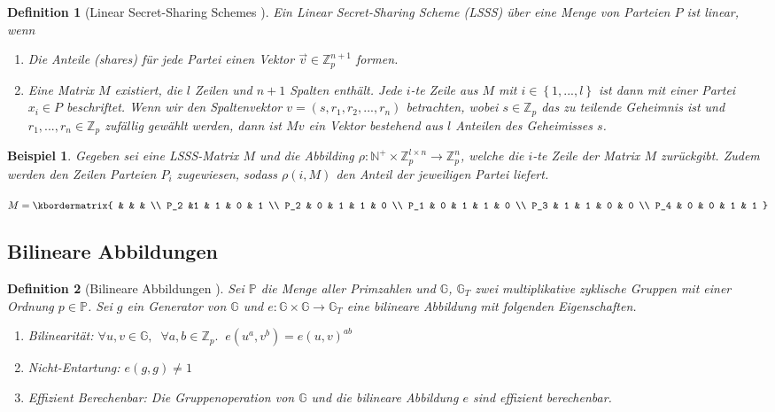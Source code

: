 \documentclass{hsflensburg}
\newtheorem{definition}{Definition}
\newtheorem*{example}{Beispiel}
\begin{document}
	\begin{definition}[Linear Secret-Sharing Schemes \cite{abe}]
		Ein Linear Secret-Sharing Scheme (LSSS) über eine Menge von Parteien $P$ ist
		linear, wenn

		\begin{enumerate}
			\item Die Anteile (shares) für jede Partei einen Vektor $\vec{v} \in
				\mathbb{Z}_p^{n+1}$ formen.
			\item Eine Matrix $M$ existiert, die $l$ Zeilen und $n+1$ Spalten enthält.
				Jede $i$-te Zeile aus $M$ mit $i \in \left\{1, ..., l\right\}$ ist dann
				mit einer Partei $x_i \in P$ beschriftet. Wenn wir den Spaltenvektor $v =
				\left(s, r_1, r_2, ..., r_n\right)$ betrachten, wobei $s \in \mathbb{Z}_p$ das zu
				teilende Geheimnis ist und $r_1, ..., r_n \in \mathbb{Z}_p$ zufällig
				gewählt werden, dann ist $Mv$ ein Vektor bestehend aus $l$ Anteilen des
				Geheimisses $s$.
		\end{enumerate}
	\end{definition}

	\begin{example}
		Gegeben sei eine LSSS-Matrix $M$ und die Abbilding $\rho : \mathbb{N^+}
		\times \mathbb{Z}_p^{l \times n} \to \mathbb{Z}_p^n$, welche die
		$i$-te Zeile der Matrix $M$ zurückgibt. Zudem werden den Zeilen Parteien
		$P_i$ zugewiesen, sodass $\rho(i, M)$ den Anteil der jeweiligen Partei liefert.
		
		$M = \kbordermatrix{
				  &   &   &   \\
			P_2 &1 & 1 & 0 & 1 \\
			P_2 &	0 & 1 & 1 & 0 \\
			P_1 &	0 & 1 & 1 & 0 \\
			P_3 &	1 & 1 & 0 & 0 \\
			P_4 &	0 & 0 & 1 & 1
			}$
	\end{example}

	\subsection{Bilineare Abbildungen}
	\begin{definition}[Bilineare Abbildungen \cite{abe}]
		Sei $\mathbb{P}$ die Menge aller Primzahlen und $\mathbb{G}$, $\mathbb{G}_T$
		zwei multiplikative zyklische Gruppen mit einer Ordnung $p \in \mathbb{P}$.
		Sei $g$ ein Generator von $\mathbb{G}$ und $e: \mathbb{G} \times \mathbb{G}
		\to \mathbb{G}_T$ eine bilineare Abbildung mit folgenden Eigenschaften.

		\begin{enumerate}
			\item Bilinearität: $\forall u, v \in \mathbb{G},\;\; \forall a, b \in
				\mathbb{Z}_p. \;\; e(u^a, v^b) = e(u, v)^{ab}$
			\item Nicht-Entartung: $e(g, g) \neq 1$
			\item Effizient Berechenbar: Die Gruppenoperation von $\mathbb{G}$ und die
				bilineare Abbildung $e$ sind effizient berechenbar.
		\end{enumerate}
	\end{definition}
\end{document}
